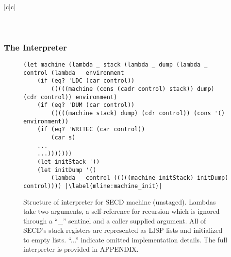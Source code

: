 \documentclass[a4paper,12pt,twoside,openright]{report}
\theoremstyle{definition}
\newcommand{\mslang}{$\lambda_{\uparrow\downarrow}$}
\begin{document}
\begin{table}[htp!]
\begin{tabular}{|c|c|}
\\ \hline
{} \\ \hline
{}
\\ \hline
\end{tabular}
\caption{Example of SECD evaluation and \mslang code generated using our PE framework. The division follows that of table \ref{tbl:secd_division}.}
\label{tbl:secd_example1}
\end{table}


\newpage
\subsubsection{The Interpreter}\label{subsec:secd_interp}
\begin{figure}[htp!]
\centering
\begin{verbatim}
(let machine (lambda _ stack (lambda _ dump (lambda _ control (lambda _ environment
    (if (eq? 'LDC (car control))
        (((((machine (cons (cadr control) stack)) dump) (cdr control)) environment)
    (if (eq? 'DUM (car control))
        (((((machine stack) dump) (cdr control)) (cons '() environment))
    (if (eq? 'WRITEC (car control))
        (car s)
    ...
    ...)))))))
    (let initStack '()
    (let initDump '()
        (lambda _ control (((((machine initStack) initDump) control)))) |\label{mline:machine_init}|
\end{verbatim}
\caption{Structure of interpreter for SECD machine (unstaged). Lambdas take two arguments, a self-reference for recursion which is ignored through a ``\_'' sentinel and a caller supplied argument. All of SECD's stack registers are represented as LISP lists and initialized to empty lists. ``...'' indicate omitted implementation details. The full interpreter is provided in APPENDIX.}
\label{lst:secd_unstaged}
\end{figure}
\end{document}
